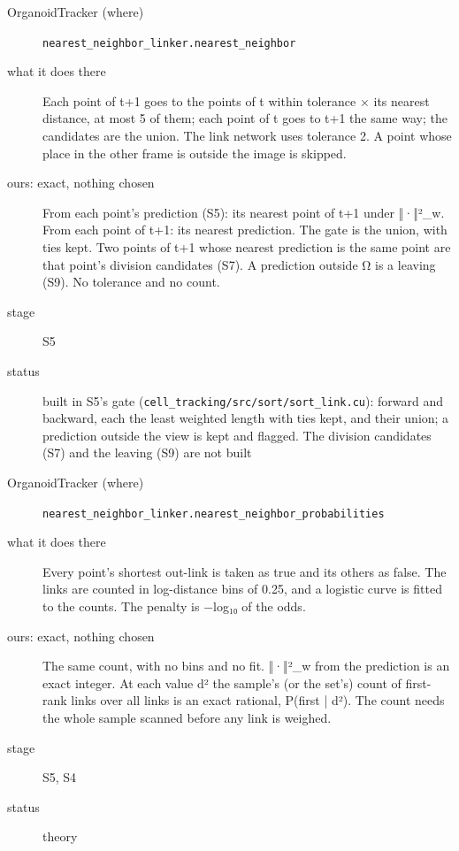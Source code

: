 \begin{description}
\item[{OrganoidTracker (where)}] \texttt{nearest\_\allowbreak{}neighbor\_\allowbreak{}linker.\allowbreak{}nearest\_\allowbreak{}neighbor}
\item[{what it does there}] Each point of t+1 goes to the points of t within tolerance × its nearest distance, at most 5 of them; each point of t goes to t+1 the same way; the candidates are the union. The link network uses tolerance 2. A point whose place in the other frame is outside the image is skipped.
\item[{ours: exact, nothing chosen}] From each point's prediction (S5): its nearest point of t+1 under ‖·‖²\_\allowbreak{}w. From each point of t+1: its nearest prediction. The gate is the union, with ties kept. Two points of t+1 whose nearest prediction is the same point are that point's division candidates (S7). A prediction outside Ω is a leaving (S9). No tolerance and no count.
\item[{stage}] S5
\item[{status}] built in S5's gate (\texttt{cell\_\allowbreak{}tracking/\allowbreak{}src/\allowbreak{}sort/\allowbreak{}sort\_\allowbreak{}link.\allowbreak{}cu}): forward and backward, each the least weighted length with ties kept, and their union; a prediction outside the view is kept and flagged. The division candidates (S7) and the leaving (S9) are not built
\end{description}

\begin{description}
\item[{OrganoidTracker (where)}] \texttt{nearest\_\allowbreak{}neighbor\_\allowbreak{}linker.\allowbreak{}nearest\_\allowbreak{}neighbor\_\allowbreak{}probabilities}
\item[{what it does there}] Every point's shortest out-link is taken as true and its others as false. The links are counted in log-distance bins of 0.25, and a logistic curve is fitted to the counts. The penalty is −log₁₀ of the odds.
\item[{ours: exact, nothing chosen}] The same count, with no bins and no fit. ‖·‖²\_\allowbreak{}w from the prediction is an exact integer. At each value d² the sample's (or the set's) count of first-rank links over all links is an exact rational, P(first | d²). The count needs the whole sample scanned before any link is weighed.
\item[{stage}] S5, S4
\item[{status}] theory
\end{description}

